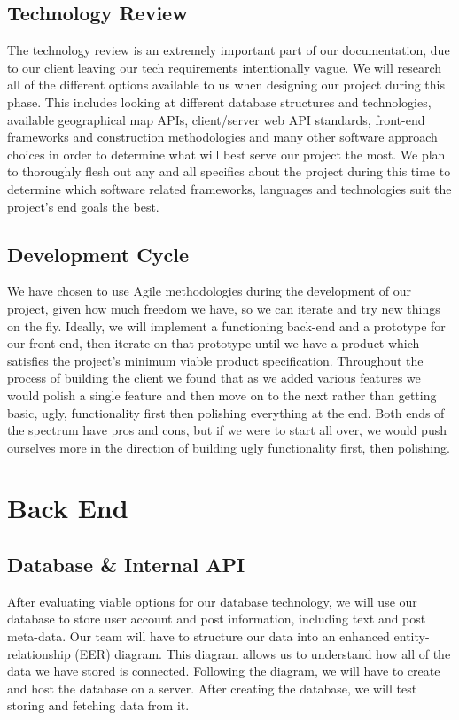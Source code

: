 \documentclass[draftclsnofoot, onecolumn,journal,letterpaper,10pt, compsoc]{IEEEtran}
\begin{document}
\subsection{Technology Review}
The technology review is an extremely important part of our documentation, due to our client leaving our tech requirements intentionally vague. We will research all of the different options available to us when designing our project during this phase. This includes looking at different database structures and technologies, available geographical map APIs, client/server web API standards, front-end frameworks and construction methodologies and many other software approach choices in order to determine what will best serve our project the most.  We plan to thoroughly flesh out any and all specifics about the project during this time to determine which software related frameworks, languages and technologies suit the project's end goals the best.

\subsection{Development Cycle}
We have chosen to use Agile methodologies during the development of our project, given how much freedom we have, so we can iterate and try new things on the fly. Ideally, we will implement a functioning back-end and a prototype for our front end, then iterate on that prototype until we have a product which satisfies the project's minimum viable product specification. Throughout the process of building the client we found that as we added various features we would polish a single feature and then move on to the next rather than getting basic, ugly, functionality first then polishing everything at the end. Both ends of the spectrum have pros and cons, but if we were to start all over, we would push ourselves more in the direction of building ugly functionality first, then polishing.

\section{Back End}

\subsection{Database \& Internal API}
After evaluating viable options for our database technology, we will use our database to store user account and post information, including text and post meta-data. Our team will have to structure our data into an enhanced entity-relationship (EER) diagram. This diagram allows us to understand how all of the data we have stored is connected. Following the diagram, we will have to create and host the database on a server. After creating the database, we will test storing and fetching data from it.
\end{document}
